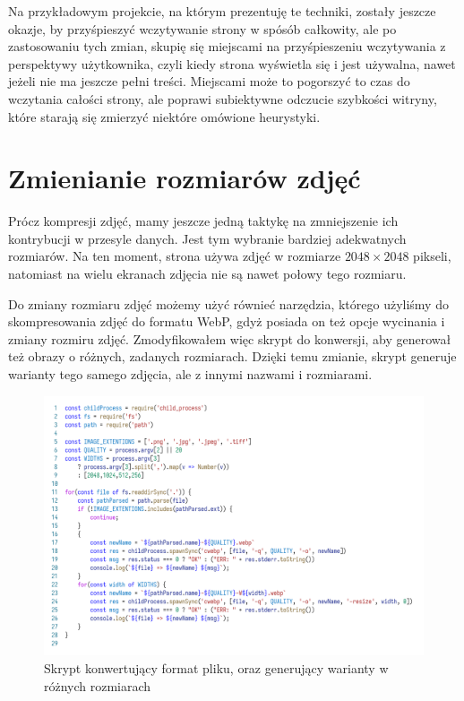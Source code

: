\documentclass[licencjacka]{pracadypl}
\begin{document}
Na przykładowym projekcie, na którym prezentuję te techniki, zostały jeszcze okazje, by przyśpieszyć wczytywanie strony w spósób całkowity, ale po zastosowaniu tych zmian, skupię się miejscami na przyśpieszeniu wczytywania z perspektywy użytkownika, czyli kiedy strona wyświetla się i jest używalna, nawet jeżeli nie ma jeszcze pełni treści. Miejscami może to pogorszyć to czas do wczytania całości strony, ale poprawi subiektywne odczucie szybkości witryny, które starają się zmierzyć niektóre omówione heurystyki.

\section{Zmienianie rozmiarów zdjęć}

Prócz kompresji zdjęć, mamy jeszcze jedną taktykę na zmniejszenie ich kontrybucji w przesyle danych. Jest tym wybranie bardziej adekwatnych rozmiarów. Na ten moment, strona używa zdjęć w rozmiarze $2048\times2048$ pikseli, natomiast na wielu ekranach zdjęcia nie są nawet połowy tego rozmiaru.

Do zmiany rozmiaru zdjęć możemy użyć równieć narzędzia, którego użyliśmy do skompresowania zdjęć do formatu WebP, gdyż posiada on też opcje wycinania i zmiany rozmiru zdjęć. Zmodyfikowałem więc skrypt do konwersji, aby generował też obrazy o różnych, zadanych rozmiarach. 
Dzięki temu zmianie, skrypt generuje warianty tego samego zdjęcia, ale z innymi nazwami i rozmiarami.

\begin{figure}[H]
  \centering
  \includegraphics[width=\linewidth]{images/code_script_conv_format_and_size.png}
  \caption{Skrypt konwertujący format pliku, oraz generujący warianty w różnych rozmiarach}
  \label{fig:script-format-and-size}
\end{figure}
\end{document}
